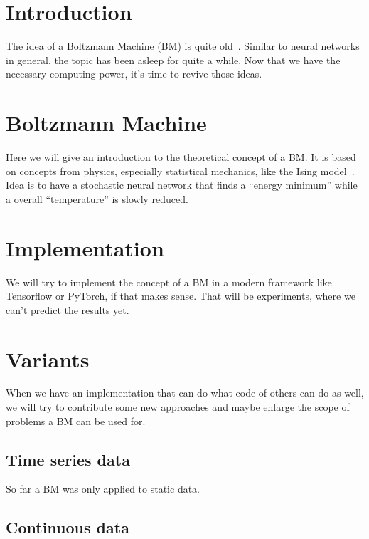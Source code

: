 \documentclass[
	12pt,
	a4paper,
	BCOR10mm,
	DIV14,
	headsepline,
	usegeometry,
]{scrreprt}
\begin{document}
\restoregeometry


\tableofcontents


\chapter{Introduction}

The idea of a Boltzmann Machine (BM) is quite old~\cite{Ackley}. Similar to neural networks in general, the topic has been asleep for quite a while. Now that we have the necessary computing power, it's time to revive those ideas.


\chapter{Boltzmann Machine}

Here we will give an introduction to the theoretical concept of a BM. It is based on concepts from physics, especially statistical mechanics, like the Ising model~\cite{Ising}. Idea is to have a stochastic neural network that finds a ``energy minimum'' while a overall ``temperature'' is slowly reduced.


\chapter{Implementation}

We will try to implement the concept of a BM in a modern framework like Tensorflow or PyTorch, if that makes sense. That will be experiments, where we can't predict the results yet.


\chapter{Variants}

When we have an implementation that can do what code of others can do as well, we will try to contribute some new approaches and maybe enlarge the scope of problems a BM can be used for.


\section{Time series data}

So far a BM was only applied to static data.


\section{Continuous data}
\end{document}
